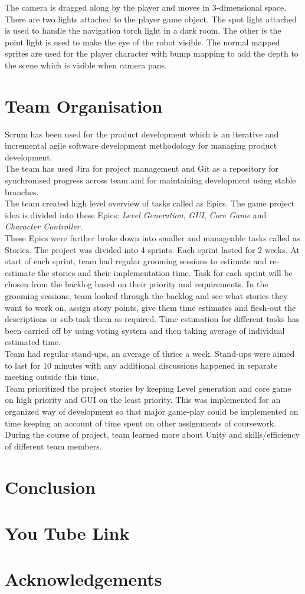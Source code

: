 \documentclass[11pt]{article}
\begin{document}
The camera is dragged along by the player and moves in 3-dimensional space. There are two lights attached to the player game object. The spot light attached is used to handle the navigation torch light in a dark room. The other is the point light is used to make the eye of the robot visible. The normal mapped sprites are used for the player character with bump mapping to add the depth to the scene which is visible when camera pans.
\section{Team Organisation}
Scrum has been used for the product development which is an iterative and incremental agile software development methodology for managing product development.\\

The team has used Jira for project management and Git as a repository for synchronised progress across team and for  maintaining development using stable branches.\\

The team created high level overview of tasks called as Epics. The game project idea is divided into these Epics: \textit{Level Generation}, \textit{GUI}, \textit{Core Game} and \textit{Character Controller}.\\

These Epics were further broke down into smaller and manageable tasks called as Stories. The project was divided into 4 sprints. Each sprint lasted for 2 weeks. At start of each sprint, team had regular grooming sessions to estimate and re-estimate the stories and their implementation time. Task for each sprint will be chosen from the backlog based on their priority and requirements. In the grooming sessions, team looked through the backlog and see what stories they want to work on, assign story points, give them time estimates and flesh-out the descriptions or sub-task them as required. Time estimation for different tasks has been carried off by using voting system and then taking average of individual estimated time.\\

Team had regular stand-ups, an average of thrice a week. Stand-ups were aimed to last for 10 minutes with any additional discussions happened in separate meeting outside this time.\\

Team prioritized the project stories by keeping Level generation and core game on high priority and GUI on the least priority. This was implemented for an organized way of development so that major game-play could be implemented on time keeping an account of time spent on other assignments of coursework. During the course of project, team learned more about Unity and skills/efficiency of different team members.

\section{Conclusion}

\section{You Tube Link}

\section{Acknowledgements}
\end{document}
